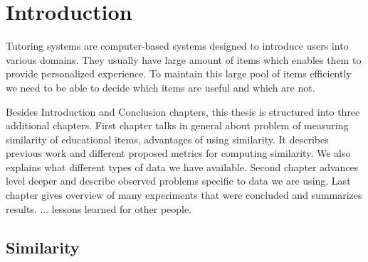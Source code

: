 \documentclass[
  digital, %
  table,   %
  nolof,     %
  nolot,     %
  nocover
]{fithesis3}
\begin{document}
%
%
%
%
%
%

\chapter*{Introduction}



Tutoring systems are computer-based systems designed to introduce users
into various domains. They usually have large amount of items which
enables them to provide personalized experience. To maintain this large
pool of items efficiently we need to be able to decide which items are
useful and which are not.





Besides Introduction and Conclusion chapters, this thesis is structured
into three additional chapters. First chapter talks in general about
problem of measuring similarity of educational items, advantages of using similarity.
It describes previous work and different proposed metrics for computing similarity. We also explains what different types of data we have
available.
Second chapter advances level deeper and describe observed problems specific to data we are using.
Last chapter gives overview of many experiments that were concluded and summarizes results.
... lessons learned for other people.

\section{Similarity}\label{similarity}
\end{document}

